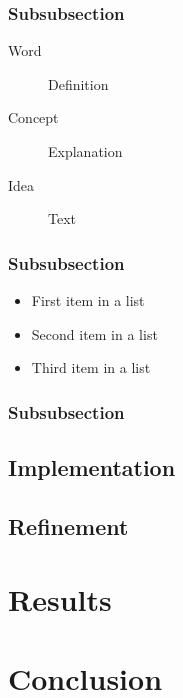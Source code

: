 \documentclass[fleqn,10pt]{SelfArx} %
\begin{document}
\lipsum[11] %



\subsubsection{Subsubsection}

\lipsum[12] %

\begin{description}
	\item[Word] Definition
	\item[Concept] Explanation
	\item[Idea] Text
\end{description}

\subsubsection{Subsubsection}

\lipsum[13] %

\begin{itemize}[noitemsep] %
	\item First item in a list
	\item Second item in a list
	\item Third item in a list
\end{itemize}

\subsubsection{Subsubsection}

\lipsum[14] %

\subsection{Implementation}

\lipsum[15-23] %

\subsection{Refinement}

\lipsum[15-23] %

\section{Results}
\lipsum[15-23] %
\section{Conclusion}
\lipsum[15-23] %
\end{document}
